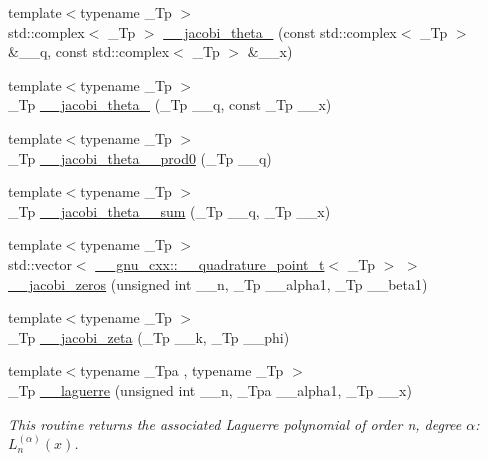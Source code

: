\begin{DoxyCompactItemize}
\item 
{\footnotesize template$<$typename \+\_\+\+Tp $>$ }\\std\+::complex$<$ \+\_\+\+Tp $>$ \hyperlink{namespacestd_1_1____detail_aa20f5817780f57d88bcfbd3f0179f9a2}{\+\_\+\+\_\+jacobi\+\_\+theta\+\_} (const std\+::complex$<$ \+\_\+\+Tp $>$ \&\+\_\+\+\_\+q, const std\+::complex$<$ \+\_\+\+Tp $>$ \&\+\_\+\+\_\+x)
\item 
{\footnotesize template$<$typename \+\_\+\+Tp $>$ }\\\+\_\+\+Tp \hyperlink{namespacestd_1_1____detail_a0e4199a4d77f33d27b09063b25c99b7f}{\+\_\+\+\_\+jacobi\+\_\+theta\+\_} (\+\_\+\+Tp \+\_\+\+\_\+q, const \+\_\+\+Tp \+\_\+\+\_\+x)
\item 
{\footnotesize template$<$typename \+\_\+\+Tp $>$ }\\\+\_\+\+Tp \hyperlink{namespacestd_1_1____detail_adf29970162f8a246fd081dba3b203779}{\+\_\+\+\_\+jacobi\+\_\+theta\+\_\+\_\+prod0} (\+\_\+\+Tp \+\_\+\+\_\+q)
\item 
{\footnotesize template$<$typename \+\_\+\+Tp $>$ }\\\+\_\+\+Tp \hyperlink{namespacestd_1_1____detail_a6f1dd356335537ad693089ccb8d8c755}{\+\_\+\+\_\+jacobi\+\_\+theta\+\_\+\_\+sum} (\+\_\+\+Tp \+\_\+\+\_\+q, \+\_\+\+Tp \+\_\+\+\_\+x)
\item 
{\footnotesize template$<$typename \+\_\+\+Tp $>$ }\\std\+::vector$<$ \hyperlink{struct____gnu__cxx_1_1____quadrature__point__t}{\+\_\+\+\_\+gnu\+\_\+cxx\+::\+\_\+\+\_\+quadrature\+\_\+point\+\_\+t}$<$ \+\_\+\+Tp $>$ $>$ \hyperlink{namespacestd_1_1____detail_a53800598007d45e144cf147c2408a3d6}{\+\_\+\+\_\+jacobi\+\_\+zeros} (unsigned int \+\_\+\+\_\+n, \+\_\+\+Tp \+\_\+\+\_\+alpha1, \+\_\+\+Tp \+\_\+\+\_\+beta1)
\item 
{\footnotesize template$<$typename \+\_\+\+Tp $>$ }\\\+\_\+\+Tp \hyperlink{namespacestd_1_1____detail_a1d5fc69202703d72974c4370fd7ade03}{\+\_\+\+\_\+jacobi\+\_\+zeta} (\+\_\+\+Tp \+\_\+\+\_\+k, \+\_\+\+Tp \+\_\+\+\_\+phi)
\item 
{\footnotesize template$<$typename \+\_\+\+Tpa , typename \+\_\+\+Tp $>$ }\\\+\_\+\+Tp \hyperlink{namespacestd_1_1____detail_a9e0b69452cb6c0ca0115c516afd46816}{\+\_\+\+\_\+laguerre} (unsigned int \+\_\+\+\_\+n, \+\_\+\+Tpa \+\_\+\+\_\+alpha1, \+\_\+\+Tp \+\_\+\+\_\+x)
\begin{DoxyCompactList}\small\item\em This routine returns the associated Laguerre polynomial of order n, degree $ \alpha $\+: $ L_n^{(\alpha)}(x) $. \end{DoxyCompactList}\item 

\end{DoxyCompactItemize}
